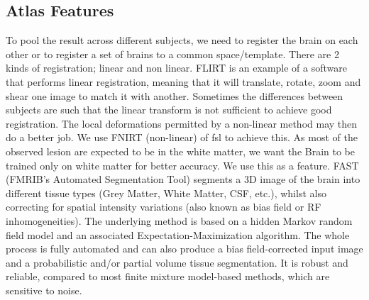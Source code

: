 \documentclass{article} %
\begin{document}
\subsection{Atlas Features}

To pool the result across different subjects, we need to register the brain on each other or to register a set of brains to a common space/template. There are 2 kinds of registration; linear and non linear. FLIRT is an example of a software that performs linear registration, meaning that it will translate, rotate, zoom and shear one image to match it with another. Sometimes the differences between subjects are such that the linear transform is not sufficient to achieve good registration. The local deformations permitted by a non-linear method may then do a better job. 
We use FNIRT (non-linear) \cite{fnirt} of fsl\cite{fsl1}\cite{fsl2}\cite{fsl3} to achieve this. As most of the observed lesion are expected to be in the white matter, we want the Brain to be trained only on white matter for better accuracy. We use this as a feature. FAST \cite{fast} (FMRIB's Automated Segmentation Tool) segments a 3D image of the brain into different tissue types (Grey Matter, White Matter, CSF, etc.), whilst also correcting for spatial intensity variations (also known as bias field or RF inhomogeneities). The underlying method is based on a hidden Markov random field model and an associated Expectation-Maximization algorithm. The whole process is fully automated and can also produce a bias field-corrected input image and a probabilistic and/or partial volume tissue segmentation. It is robust and reliable, compared to most finite mixture model-based methods, which are sensitive to noise. 
\end{document}
